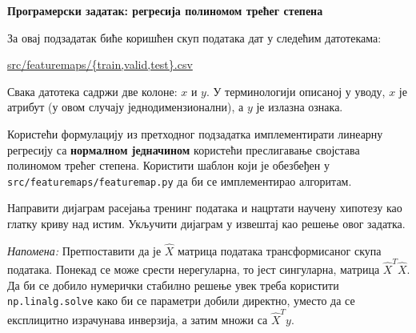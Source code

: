 \item{} {\bf Програмерски задатак: регресија полиномом трећег степена}

За овај подзадатак биће коришћен скуп података дат у следећим датотекама:
%
\begin{center}
\url{src/featuremaps/{train,valid,test}.csv}
\end{center}
%
Свака датотека садржи две колоне: $x$ и $y$. У терминологији описаној у уводу, $x$ је атрибут (у овом случају једнодимензионални), а $y$ је излазна ознака.

Користећи формулацију из претходног подзадатка имплементирати линеарну регресију са \textbf{нормалном једначином} користећи преслигавање својстава полиномом трећег степена. Користити шаблон који је обезбеђен у \texttt{src/featuremaps/featuremap.py} да би се имплементирао алгоритам.

Направити дијаграм расејања тренинг података и нацртати научену хипотезу као глатку криву над истим. Укључити дијаграм у извештај као решење овог задатка.

\emph{Напомена:} Претпоставити да је $\widehat{X}$ матрица података трансформисаног скупа података. Понекад се може срести нерегуларна, то јест сингуларна, матрица $\widehat{X}^T\widehat{X}$. Да би се добило нумерички стабилно решење увек треба користити \texttt{np.linalg.solve} како би се параметри добили директно, уместо да се експлицитно израчунава инверзија, а затим множи са $\widehat{X}^Ty$.

